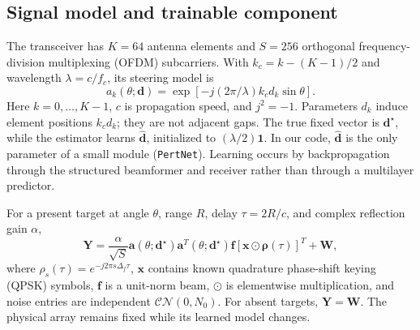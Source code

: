 \documentclass[conference]{IEEEtran}
\begin{document}
\subsection{Signal model and trainable component}
The transceiver has $K=64$ antenna elements and $S=256$ orthogonal frequency-division multiplexing (OFDM) subcarriers. With $k_c=k-(K-1)/2$ and wavelength $\lambda=c/f_c$, its steering model is
\begin{equation}
 a_k(\theta;\mathbf d)=\exp[-j(2\pi/\lambda)k_c d_k\sin\theta].
 \label{eq:steer}
\end{equation}
Here $k=0,\ldots,K-1$, $c$ is propagation speed, and $j^2=-1$. Parameters $d_k$ induce element positions $k_cd_k$; they are not adjacent gaps. The true fixed vector is $\mathbf d^\star$, while the estimator learns $\widehat{\mathbf d}$, initialized to $(\lambda/2)\mathbf1$. In our code, $\widehat{\mathbf d}$ is the only parameter of a small module (\texttt{PertNet}). Learning occurs by backpropagation through the structured beamformer and receiver rather than through a multilayer predictor.

For a present target at angle $\theta$, range $R$, delay $\tau=2R/c$, and complex reflection gain $\alpha$,
\begin{equation}
 \mathbf Y=\frac{\alpha}{\sqrt S}\mathbf a(\theta;\mathbf d^\star)
 \mathbf a^T(\theta;\mathbf d^\star)\mathbf f
 [\mathbf x\odot\bm\rho(\tau)]^T+\mathbf W,
 \label{eq:obs}
\end{equation}
where $\rho_s(\tau)=e^{-j2\pi s\Delta_f\tau}$, $\mathbf x$ contains known quadrature phase-shift keying (QPSK) symbols, $\mathbf f$ is a unit-norm beam, $\odot$ is elementwise multiplication, and noise entries are independent $\mathcal{CN}(0,N_0)$. For absent targets, $\mathbf Y=\mathbf W$. The physical array remains fixed while its learned model changes.
\end{document}
